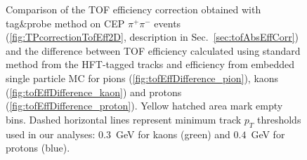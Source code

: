 \begin{figure}[b!]\vspace{-34pt}
\centering
\parbox{0.31\textwidth}{
  \centering
  \begin{subfigure}[b]{\linewidth}{
                }
  \end{subfigure} 
} 
\quad
\parbox{0.65\textwidth}{ 
  \centering
		\begin{minipage}[t][0.64\linewidth][t]{\linewidth}\vspace{73pt}
			\caption[Comparison of the TOF eff. correction from tag\&probe method and the difference between TOF eff. calculated using standard method from the HFT-tagged tracks and efficiency from embedded single particle MC.]%
    {Comparison of the TOF efficiency correction obtained with tag\&probe method on CEP $\pi^{+}\pi^{-}$ events (\ref{fig:TPcorrectionTofEff2D}, description in Sec.~\ref{sec:tofAbsEffCorr}) and the difference between TOF efficiency calculated using standard method from the HFT-tagged tracks and efficiency from embedded single particle MC for pions (\ref{fig:tofEffDifference_pion}), kaons (\ref{fig:tofEffDifference_kaon}) and protons (\ref{fig:tofEffDifference_proton}). Yellow hatched area mark empty bins. Dashed horizontal lines represent minimum track $p_{T}$ thresholds used in our analyses: $0.3$~GeV for kaons (green) and $0.4$~GeV for protons (blue).}\label{fig:tofEffSystematics2DComparison}%
		\end{minipage}
}
\end{figure}
